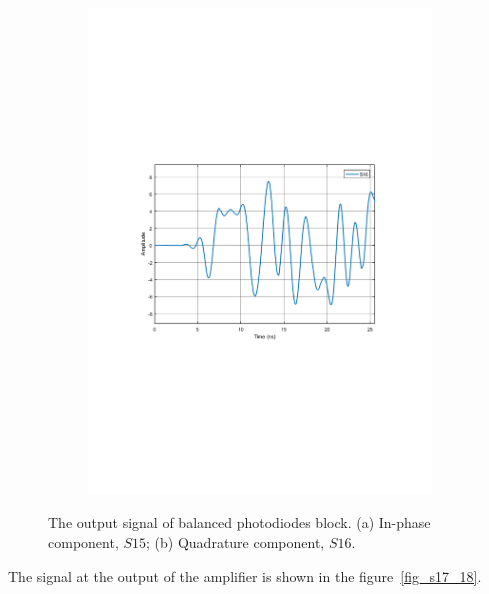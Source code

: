 \begin{refsection}
\begin{figure}[h!]
\begin{subfigure}{.5\textwidth}
  \includegraphics[width=\linewidth]{./sdf/dsp_laser_phase_compensation/figures/S16_td.pdf}
  \caption{}
  \label{fig:sub2}
\end{subfigure}
\caption{The output signal of balanced photodiodes block. (a) In-phase component, $S15$; (b)  Quadrature component, $S16$.}
\label{fig_s15_16}
\end{figure}

\pagebreak

The signal at the output of the amplifier is shown in the figure~\ref{fig_s17_18}.


\end{refsection}
